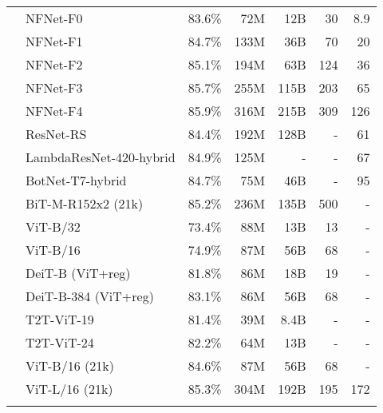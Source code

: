 \documentclass{article}
\begin{document}
\begin{table*}
{\begin{tabular}{cl||rrrrr}
          &NFNet-F0 \cite{nfnet21}              &   83.6\%  &     72M   &   12B   &     30    & 8.9    \\ 
          &NFNet-F1 \cite{nfnet21}              &   84.7\%  &    133M   &   36B   &     70    & 20    \\ 
          &NFNet-F2 \cite{nfnet21}              &   85.1\%  &    194M   &   63B   &    124    & 36    \\ 
          &NFNet-F3 \cite{nfnet21}              &   85.7\%  &    255M   &  115B   &    203    & 65    \\ 
          &NFNet-F4 \cite{nfnet21}              &   85.9\%  &    316M   &  215B   &    309    & 126   \\ 
&ResNet-RS \cite{resnetrs21}             &   84.4\%  &    192M   & 128B    &    -      & 61 \\
          &LambdaResNet-420-hybrid \cite{lambdanet21}& 84.9\% &   125M       &    -    &    -      & 67  \\
&BotNet-T7-hybrid \cite{botnet21}            &  84.7\%   &   75M     &   46B   &    -      & 95  \\
&BiT-M-R152x2 (21k)  \cite{bit20}     &   85.2\%  &    236M   &  135B   &    500    &  -   \\
        \midrule
          &ViT-B/32 \cite{vit21}                &   73.4\%  &     88M   &   13B   &     13    & -    \\
          &ViT-B/16  \cite{vit21}               &   74.9\%  &     87M   &   56B   &     68    & -    \\
&DeiT-B (ViT+reg)  \cite{deit21}               &   81.8\%  &     86M   &   18B   &     19    & -    \\
          &DeiT-B-384  (ViT+reg) \cite{deit21}            &   83.1\%  &     86M   &   56B   &    68    & -    \\
&T2T-ViT-19  \cite{t2tvit21}               &   81.4\%  &     39M  &   8.4B   &     -    & -    \\
          &T2T-ViT-24  \cite{t2tvit21}               &   82.2\%  &     64M   &   13B   &     -    & -    \\
&ViT-B/16 (21k) \cite{vit21}          &   84.6\%  &    87M   &  56B   &    68   &  - \\
          &ViT-L/16 (21k) \cite{vit21}          &   85.3\%  &    304M   &  192B   &    195   &  172 \\
        \midrule

\end{tabular}}
\end{table*}
\end{document}
